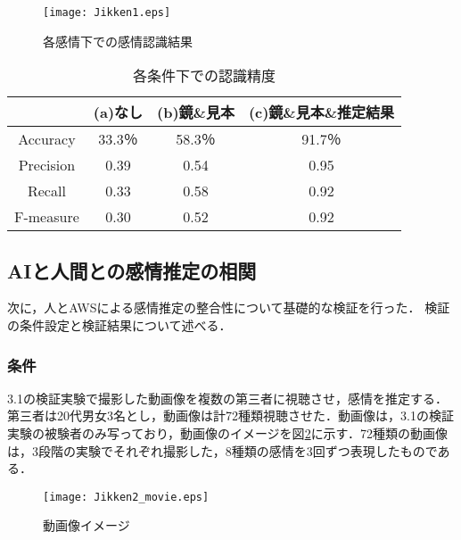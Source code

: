 \documentclass[titlepage]{jarticle}
\begin{document}

\begin{figure}[h]
\begin{center}
\texttt{[image: Jikken1.eps]}
\end{center}
\caption{各感情下での感情認識結果}
\label{Jikken1} %
\end{figure}


\begin{table}[h]
\centering
\caption{各条件下での認識精度}
\begin{tabular}{|c||c|c|c|}
	\hline
         & (a)なし & (b)鏡\&見本 & (c)鏡\&見本\&推定結果\\
    \hline
    \hline
		Accuracy & 33.3$％$ & 58.3$％$ & 91.7$％$\\
	\hline
		Precision & 0.39 & 0.54  & 0.95\\
	\hline
		Recall & 0.33 & 0.58 & 0.92 \\
	\hline
		F-measure & 0.30 & 0.52 & 0.92\\
	\hline
\end{tabular}
\label{Jikken1_accuracy}
\end{table}


\afterpage{\clearpage}
\newpage

\subsection{AIと人間との感情推定の相関}
次に，人とAWSによる感情推定の整合性について基礎的な検証を行った．
検証の条件設定と検証結果について述べる．

\subsubsection{条件}
3.1の検証実験で撮影した動画像を複数の第三者に視聴させ，感情を推定する．第三者は20代男女3名とし，動画像は計72種類視聴させた．動画像は，3.1の検証実験の被験者のみ写っており，動画像のイメージを図\ref{Jikken2 movie}に示す．72種類の動画像は，3段階の実験でそれぞれ撮影した，8種類の感情を3回ずつ表現したものである．

\begin{figure}[h]
\begin{center}
\texttt{[image: Jikken2\_movie.eps]}
\end{center}
\caption{動画像イメージ}
\label{Jikken2 movie} %
\end{figure}
\end{document}
